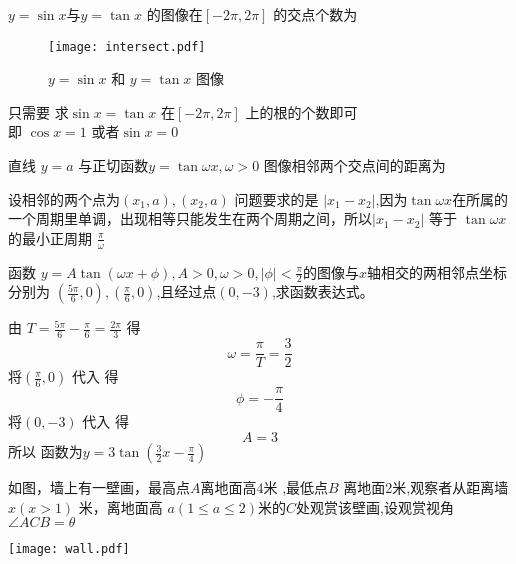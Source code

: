 \documentclass[12pt,answers]{exam}
\begin{document}
\begin{questions}
\question $y=\sin{x}$与$y=\tan{x}$ 的图像在$[-2\pi,2\pi]$ 的交点个数为\fillin[5]
\ifprintanswers
\begin{figure}[!h]
\begin{center}
\texttt{[image: intersect.pdf]}
\end{center}
\caption{$y=\sin{x} $ 和 $y=\tan{x}$ 图像}
\end{figure}
\fi
\begin{solution}
只需要 求$\sin{x}=\tan{x}$ 在$[-2\pi,2\pi]$ 上的根的个数即可\\
即 $\cos{x}=1$ 或者$\sin{x}=0$ 
\end{solution}
\question 
直线 $y=a$ 与正切函数$y=\tan{\omega x},\omega>0$ 图像相邻两个交点间的距离为 \fillin[$\frac{\pi}{\omega}$]
\begin{solution}
设相邻的两个点为$(x_1,a),(x_2,a)$ 问题要求的是 $|x_1-x_2|$,因为$\tan{\omega x}$在所属的一个周期里单调，出现相等只能发生在两个周期之间，所以$|x_1-x_2|$ 等于 $\tan{\omega x}$的最小正周期 $\frac{\pi}{\omega}$
\end{solution}
\question
函数 $y=A\tan(\omega x +\phi),A>0,\omega>0,|\phi|<\frac{\pi}{2}$的图像与$x$轴相交的两相邻点坐标分别为
$(\frac{5\pi}{6},0),(\frac{\pi}{6},0)$,且经过点$(0,-3)$,求函数表达式。
\begin{solution}
由 $T=\frac{5\pi}{6}-\frac{\pi}{6}=\frac{2\pi}{3}$ 得
\[\omega=\frac{\pi}{T}=\frac{3}{2}\]
将$(\frac{\pi}{6},0)$ 代入 得$$\phi=-\frac{\pi}{4}$$
将$(0,-3)$ 代入 得$$A=3$$
所以 函数为$y=3\tan{(\frac{3}{2}x-\frac{\pi}{4})}$
\end{solution}
\question
如图，墙上有一壁画，最高点$A$离地面高$4$米
,最低点$B$ 离地面2米,观察者从距离墙$x(x>1)$ 米，离地面高
$a(1\le a\le 2)$米的$C$处观赏该壁画,设观赏视角$\angle ACB=\theta$ 
\begin{center}
\texttt{[image: wall.pdf]}
\end{center}
\end{questions}
\end{document}
